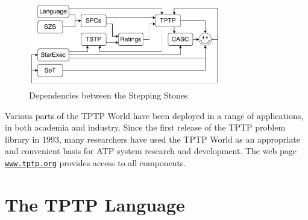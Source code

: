 \documentclass{easychair}
\begin{document}
\begin{figure}[htbp]
\centering
\includegraphics[width=0.75\textwidth]{Dependencies.pdf}
\caption{Dependencies between the Stepping Stones}
\label{Dependencies}
\end{figure}

Various parts of the TPTP World have been deployed in a range of applications, in both academia 
and industry.
Since the first release of the TPTP problem library in 1993, many researchers have used the 
TPTP World as an appropriate and convenient basis for ATP system research and development. 
The web page \href{http://www.tptp.org}{{\tt www.tptp.org}} provides access to all components.


\section{The TPTP Language}
\label{Languages}
\end{document}

